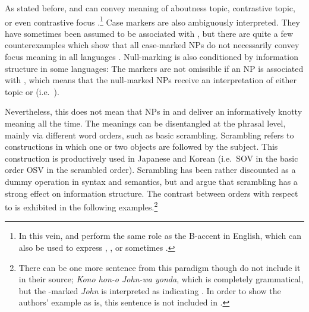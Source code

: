 \noindent As stated before, \wa and \nun can convey meaning of
aboutness topic, contrastive topic, or even contrastive
focus \citep{choi:99,song:bender:11}.\footnote{In this vein, 
\wa and \nun perform the same role as the
  B-accent in English, which can also be used to express
  , ,
  or sometimes  \citep{hedberg:06}.}  Case
markers are also ambiguously interpreted.  They have sometimes been
assumed to be associated with , but there are quite a few
counterexamples which show that all case-marked NPs do not necessarily
convey focus meaning in all languages \citep{heycock:94}. Null-marking
is also conditioned by information structure in some languages: The
markers are not omissible if an NP is associated with ,
which means that the null-marked NPs receive an interpretation of
either topic or  (i.e.\ ).


Nevertheless, this does not mean that NPs in  and
 deliver an informatively knotty meaning all the time. The
meanings can be disentangled at the phrasal level, mainly via
different word orders, such as basic \vs scrambling.
Scrambling refers to constructions in which one or two objects are
followed by the subject. This construction is productively used in
Japanese and Korean (i.e.\ SOV in the basic order \vs OSV in the
scrambled order). Scrambling has been rather discounted as a dummy
operation in syntax and semantics, but \citet{choi:99} and
\citet{ishihara:01} argue that scrambling has a strong effect on
information structure.  The contrast between orders with respect to
\wa is exhibited in the following examples.\footnote{There can be one
  more sentence from this paradigm though \citet{maki:etal:99} do not
  include it in their source; \textit{Kono hon-o John-wa yonda}, which
  is completely grammatical, but the \wa-marked \textit{John} is
  interpreted as indicating . In order to show the
  authors' example as is, this sentence is not included in
  .}







